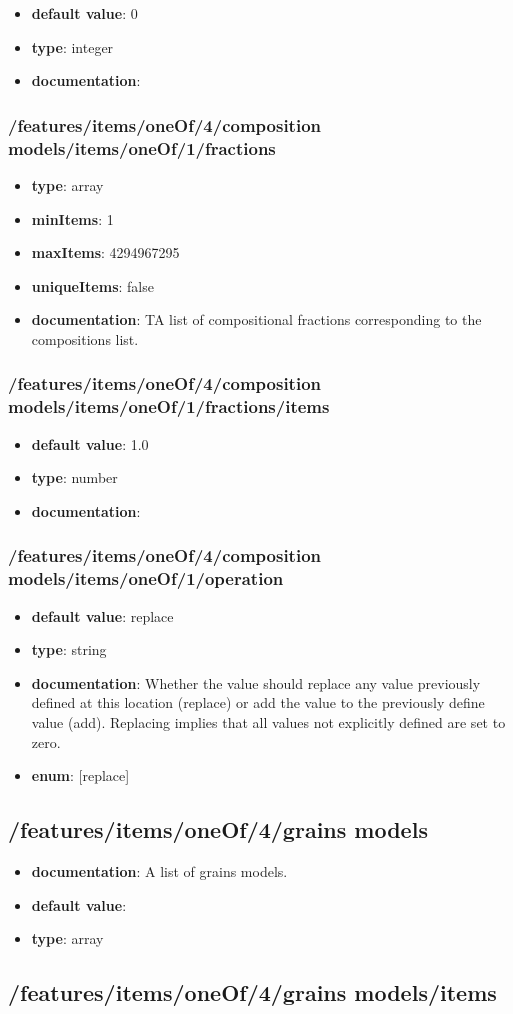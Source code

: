 \begin{itemize}\item {\bf default value}: 0
\item {\bf type}: integer
\item {\bf documentation}: 
\end{itemize}\subsubsection{/features/items/oneOf/4/composition models/items/oneOf/1/fractions}
\begin{itemize}\item {\bf type}: array
\item {\bf minItems}: 1
\item {\bf maxItems}: 4294967295
\item {\bf uniqueItems}: false
\item {\bf documentation}: TA list of compositional fractions corresponding to the compositions list.
\end{itemize}\subsubsection{/features/items/oneOf/4/composition models/items/oneOf/1/fractions/items}
\begin{itemize}\item {\bf default value}: 1.0
\item {\bf type}: number
\item {\bf documentation}: 
\end{itemize}\subsubsection{/features/items/oneOf/4/composition models/items/oneOf/1/operation}
\begin{itemize}\item {\bf default value}: replace
\item {\bf type}: string
\item {\bf documentation}: Whether the value should replace any value previously defined at this location (replace) or add the value to the previously define value (add). Replacing implies that all values not explicitly defined are set to zero.
\item {\bf enum}: [replace]\end{itemize}\subsection{/features/items/oneOf/4/grains models}
\begin{itemize}\item {\bf documentation}: A list of grains models.
\item {\bf default value}: 
\item {\bf type}: array
\end{itemize}\subsection{/features/items/oneOf/4/grains models/items}


